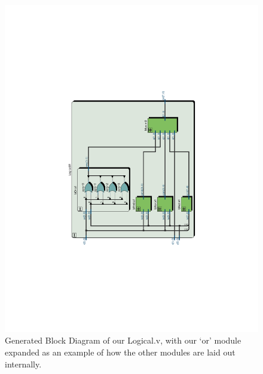 \documentclass[11pt]{article}
\begin{document}
\begin{figure}[H]
    \centering
        \includegraphics[clip, trim=5cm 6cm 5cm 6cm, angle=270, width=\textwidth]{Logical}
        \caption{Generated Block Diagram of our Logical.v, with our `or' module expanded as an example of how the other modules are laid out internally. }
    \label{fig:logicalgen}
\end{figure}
\end{document}
